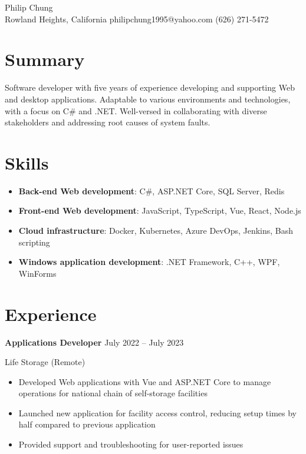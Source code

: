 \documentclass[12pt]{article}
\newcommand{\titleheader}[2]{\textbf{#1} \symbol{"B7} #2}
\newcommand{\locheader}[2]{#1 (#2)}
\begin{document}
	\begin{center}
		{ Philip Chung} \\ \vspace{0.5em}
		Rowland Heights, California  philipchung1995@yahoo.com  (626) 271-5472
	\end{center}

	\begin{adjustwidth}{0.25in}{}

	\section*{Summary}

	Software developer with five years of experience developing and supporting Web and desktop applications. Adaptable to various environments and technologies, with a focus on C\# and .NET. Well-versed in collaborating with diverse stakeholders and addressing root causes of system faults.

	\section*{Skills}

	\newcommand{\skillitem}[2]{\item \textbf{#1}: #2}

	\begin{itemize}[left=0in .. 0.125in]
		\skillitem{Back-end Web development}{C\#, ASP.NET Core, SQL Server, Redis}
		\skillitem{Front-end Web development}{JavaScript, TypeScript, Vue, React, Node.js}
		\skillitem{Cloud infrastructure}{Docker, Kubernetes, Azure DevOps, Jenkins, Bash scripting}
		\skillitem{Windows application development}{.NET Framework, C++, WPF, WinForms}
	\end{itemize}

	\section*{Experience}

	\titleheader{Applications Developer}{July 2022 -- July 2023}

	\locheader{Life Storage}{Remote}

	\begin{itemize}
		\item Developed Web applications with Vue and ASP.NET Core to manage operations for national chain of self-storage facilities
		\item Launched new application for facility access control, reducing setup times by half compared to previous application
		\item Provided support and troubleshooting for user-reported issues
	\end{itemize}


\end{adjustwidth}
\end{document}

